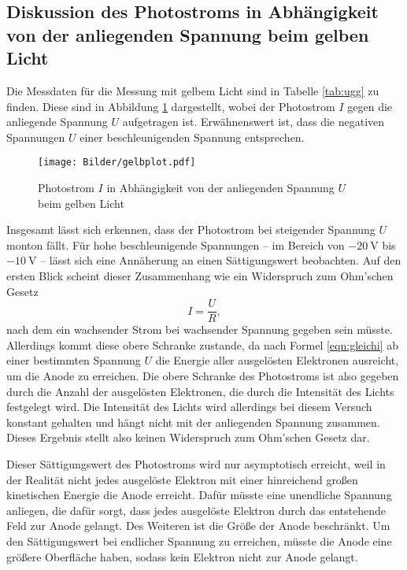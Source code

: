 \FloatBarrier
\subsection{Diskussion des Photostroms in Abhängigkeit von der anliegenden Spannung beim gelben Licht}

Die Messdaten für die Messung mit gelbem Licht sind in Tabelle \ref{tab:ugg} zu finden.
Diese sind in Abbildung \ref{fig:datayellow} dargestellt, wobei der Photostrom $I$ gegen die
anliegende Spannung $U$ aufgetragen ist. Erwähnenswert ist, dass die negativen Spannungen $U$
einer beschleunigenden Spannung entsprechen.
\begin{figure}
	\centering
	\caption{Photostrom $I$ in Abhängigkeit von der anliegenden Spannung $U$ beim gelben Licht}
	\label{fig:datayellow}
	\texttt{[image: Bilder/gelbplot.pdf]}
\end{figure}
Insgesamt lässt sich erkennen, dass der Photostrom bei steigender Spannung $U$ monton fällt.
Für hohe beschleunigende Spannungen -- im Bereich von $-\SI{20}{\volt}$ bis $-\SI{10}{\volt}$ --
lässt sich eine Annäherung an einen Sättigungswert beobachten. Auf den ersten Blick scheint
dieser Zusammenhang wie ein Widerspruch zum Ohm'schen Gesetz
\begin{equation*}
	I = \frac{U}{R} \mathrm{,}
\end{equation*}
nach dem ein wachsender Strom bei wachsender Spannung gegeben sein müsste.
Allerdings kommt diese obere Schranke zustande, da nach Formel \eqref{eqn:gleichi} ab einer
bestimmten Spannung $U$ die Energie aller ausgelösten Elektronen ausreicht, um die Anode zu
erreichen. Die obere Schranke des Photostroms ist also gegeben durch die Anzahl der
ausgelösten Elektronen, die durch die Intensität des Lichts festgelegt wird. Die Intensität
des Lichts wird allerdings bei diesem Versuch konstant gehalten und hängt nicht mit der
anliegenden Spannung zusammen. Dieses Ergebnis stellt also keinen Widerspruch zum
Ohm'schen Gesetz dar.

Dieser Sättigungswert des Photostroms wird nur asymptotisch erreicht, weil in der Realität
nicht jedes ausgelöste Elektron mit einer hinreichend großen kinetischen Energie die Anode
erreicht. Dafür müsste eine unendliche Spannung anliegen, die dafür sorgt, dass jedes
ausgelöste Elektron durch das entstehende Feld zur Anode gelangt. Des Weiteren ist die
Größe der Anode beschränkt.
Um den Sättigungswert bei endlicher Spannung zu erreichen, müsste die Anode eine größere
Oberfläche haben, sodass kein Elektron nicht zur Anode gelangt.

